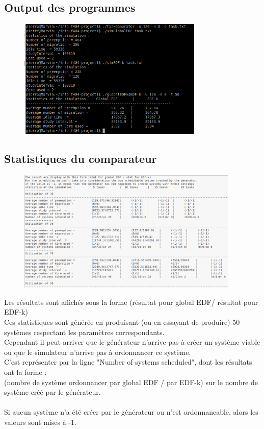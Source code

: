 \documentclass[a4paper,10pt]{article}
\begin{document}
	 \subsection{Output des programmes}
		\begin{figure}[H] \hspace*{-2cm} 
    	\centering
   		  \includegraphics[width=250pt]{output3.png} 
	  	\end{figure}
	  	
	  
	 \subsection{Statistiques du comparateur}
		\begin{figure}[H] \hspace*{-2cm} 
    	\centering
   		  \includegraphics[width=300pt]{stat2.png} 
	  	\end{figure}


		Les résultats sont affichés sous la forme (résultat pour global EDF/ résultat pour EDF-k)\\
		Ces statistiques sont générée en produisant (ou en essayant de produire) 50 systèmes respectant les paramètres correspondants.\\
		Cependant il peut arriver que le générateur n'arrive pas à créer un système viable ou que le simulateur n'arrive pas à ordonnancer ce système.\\
		C'est représenter par la ligne "Number of systems scheduled", dont les résultats ont la forme :\\
		(nombre de système ordonnancer par global EDF / par EDF-k) sur le nombre de système créé par le générateur.\\
		~\\
		Si aucun système n'a été créer par le générateur ou n'est ordonnancable, alors les valeurs sont mises à -1.
\end{document}

